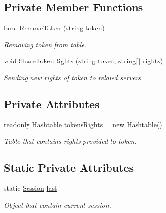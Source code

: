 \subsection*{Private Member Functions}
\begin{DoxyCompactItemize}
\item 
bool \mbox{\hyperlink{class_authority_controller_1_1_session_a8422d53f01daff616c1588cb3d657882}{Remove\+Token}} (string token)
\begin{DoxyCompactList}\small\item\em Removing token from table. \end{DoxyCompactList}\item 
void \mbox{\hyperlink{class_authority_controller_1_1_session_ae8e875b83d01b42f4623d2c81841ce62}{Share\+Token\+Rights}} (string token, string\mbox{[}$\,$\mbox{]} rights)
\begin{DoxyCompactList}\small\item\em Sending new rights of token to related servers. \end{DoxyCompactList}\end{DoxyCompactItemize}
\subsection*{Private Attributes}
\begin{DoxyCompactItemize}
\item 
readonly Hashtable \mbox{\hyperlink{class_authority_controller_1_1_session_a69364ca8d68ac74a7220bdabb1551799}{tokens\+Rights}} = new Hashtable()
\begin{DoxyCompactList}\small\item\em Table that contains rights provided to token. \end{DoxyCompactList}\end{DoxyCompactItemize}
\subsection*{Static Private Attributes}
\begin{DoxyCompactItemize}
\item 
\mbox{\label{class_authority_controller_1_1_session_a774ff0a1fec6aae096af9ed744c7269d}} 
static \mbox{\hyperlink{class_authority_controller_1_1_session}{Session}} \mbox{\hyperlink{class_authority_controller_1_1_session_a774ff0a1fec6aae096af9ed744c7269d}{last}}
\begin{DoxyCompactList}\small\item\em Object that contain current session. \end{DoxyCompactList}\end{DoxyCompactItemize}


